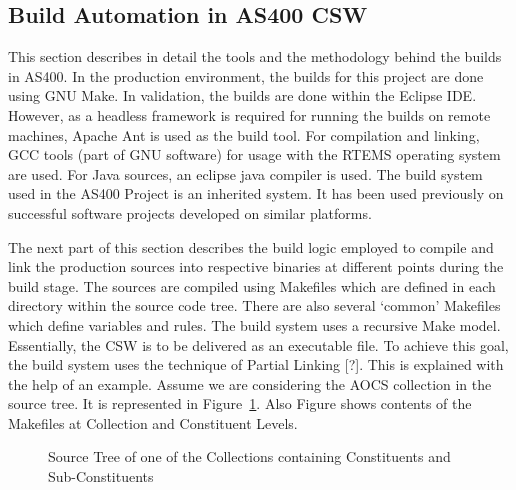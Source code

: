 \documentclass[12pt, a4paper, titlepage]{scrartcl}
\begin{document}
\subsection{Build Automation in AS400 CSW}
This section describes in detail the tools and the methodology behind the builds in AS400. In the production environment, the builds for this project are done using GNU Make. In validation, the builds are done within the Eclipse IDE. However, as a headless framework is required for running the builds on remote machines, Apache Ant is used as the build tool. For compilation and linking, GCC tools (part of GNU software) for usage with the RTEMS operating system are used. For Java sources, an eclipse java compiler is used. 
The build system used in the AS400 Project is an inherited system. It has been used previously on successful software projects developed on similar platforms. 
\par The next part of this section describes the build logic employed to compile and link the production sources into respective binaries at different points during the build stage. The sources are compiled using Makefiles which are defined in each directory within the source code tree. There are also several ‘common’ Makefiles which define variables and rules. The build system uses a recursive Make model.   
Essentially, the CSW is to be delivered as an executable file. To achieve this goal, the build system uses the technique of Partial Linking [?]. This is explained with the help of an example. 
Assume we are considering the AOCS collection in the source tree. It is represented in Figure~\ref{fig:source-tree-collection-constituent}. Also Figure shows contents of the Makefiles at Collection and Constituent Levels.
\begin{figure}[!ht]
\caption{Source Tree of one of the Collections containing Constituents and Sub-Constituents}
\label{fig:source-tree-collection-constituent}
\noindent{}
\end{figure}
\end{document}
